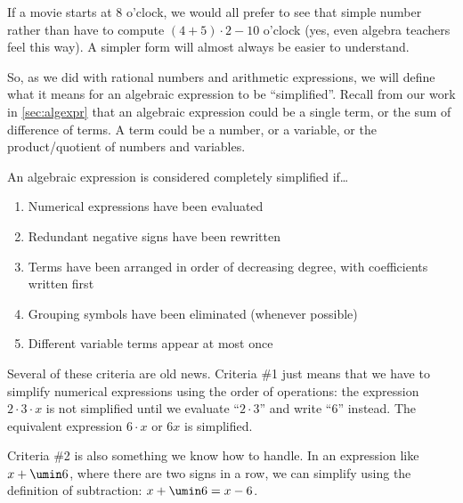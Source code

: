If a movie starts at 8 o'clock, we would all prefer to see that simple number rather than have to compute $(4+5)\cdot2-10$ o'clock (yes, even algebra teachers feel this way). A simpler form will almost always be easier to understand.

So, as we did with rational numbers and arithmetic expressions, we will define what it means for an algebraic expression to be ``simplified''. Recall from our work in \cref{sec:algexpr} that an \gls{algebraic expression} could be a single term, or the sum of difference of terms. A \gls{term} could be a number, or a variable, or the product/quotient of numbers and variables.

\begin{boxcrit}
An algebraic expression is considered completely simplified if\ldots
\begin{enumerate}
	\item Numerical expressions have been evaluated
	\item Redundant negative signs have been rewritten
	\item Terms have been arranged in order of decreasing degree, with coefficients written first
	\item Grouping symbols have been eliminated (whenever possible)
	\item Different variable terms appear at most once
\end{enumerate}
\end{boxcrit}

Several of these criteria are old news. Criteria \#1 just means that we have to simplify numerical expressions using the order of operations: the expression $2 \cdot 3 \cdot x$ is not simplified until we evaluate ``$2 \cdot 3$'' and write ``6'' instead. The equivalent expression $6 \cdot x$ or $6x$ is simplified.

Criteria \#2 is also something we know how to handle. In an expression like $x + \umin6$, where there are two signs in a row, we can simplify using the definition of subtraction: $x + \umin6 = x - 6$.

